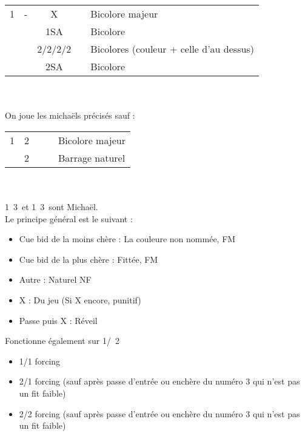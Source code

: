 \documentclass[a4paper, oneside, 11pt]{report}
\begin{document}
	\begin{tabular}{cccc|l}
	1\trefle & -  & X && Bicolore majeur\\
	&& 1SA && Bicolore \coeur\trefle\\
	&& 2\trefle/2\carreau/2\coeur/2\pique && Bicolores (couleur + celle d'au dessus)\\
	&& 2SA && Bicolore \carreau\pique\\
	\end{tabular}\\\\

	On joue les michaëls précisés sauf :\\
		
	\begin{tabular}{cccc|l}
	1\trefle & 2\trefle &&& Bicolore majeur\\
	& 2\carreau &&& Barrage naturel\\
	\end{tabular}\\\\

	1\trefle\ 3\trefle\ et 1\carreau\ 3\trefle\ sont Michaël.\\

	Le principe général est le suivant :
	\begin{itemize}
	\item Cue bid de la moins chère : La couleure non nommée, FM
	\item Cue bid de la plus chère : Fittée, FM
	\item Autre : Naturel NF\\
	\item X : Du jeu (Si X encore, punitif)
	\item Passe puis X : Réveil\\
	\end{itemize}
	Fonctionne également sur 1\trefle/\carreau\ 2\carreau

	\begin{itemize}
	\item 1/1 forcing
	\item 2/1 forcing (sauf après passe d'entrée ou enchère du numéro 3 qui n'est pas un fit faible)
	\item 2/2 forcing (sauf après passe d'entrée ou enchère du numéro 3 qui n'est pas un fit faible)\\
	\end{itemize}
	
\end{document}
